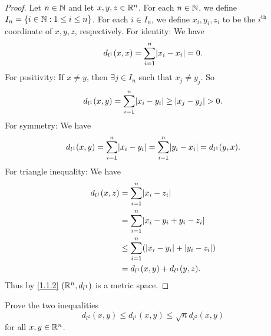 \begin{proof}
  Let \(n \in \mathbb{N}\) and let \(x, y, z \in \mathbb{R}^n\).
  For each \(n \in \mathbb{N}\), we define \(I_n = \{i \in \mathbb{N} : 1 \leq i \leq n\}\).
  For each \(i \in I_n\), we define \(x_i, y_i, z_i\) to be the \(i^{\text{th}}\) coordinate of \(x, y, z\), respectively.
  For identity:
  We have
  \[
    d_{l^1}(x, x) = \sum_{i = 1}^n \abs{x_i - x_i} = 0.
  \]
  For positivity:
  If \(x \neq y\), then \(\exists j \in I_n\) such that \(x_j \neq y_j\).
  So
  \[
    d_{l^1}(x, y) = \sum_{i = 1}^n \abs{x_i - y_i} \geq \abs{x_j - y_j} > 0.
  \]
  For symmetry:
  We have
  \[
    d_{l^1}(x, y) = \sum_{i = 1}^n \abs{x_i - y_i} = \sum_{i = 1}^n \abs{y_i - x_i} = d_{l^1}(y, x).
  \]
  For triangle inequality:
  We have
  \begin{align*}
    d_{l^1}(x, z) & = \sum_{i = 1}^n \abs{x_i - z_i}                        \\
                  & = \sum_{i = 1}^n \abs{x_i - y_i + y_i - z_i}            \\
                  & \leq \sum_{i = 1}^n (\abs{x_i - y_i} + \abs{y_i - z_i}) \\
                  & = d_{l^1}(x, y) + d_{l^1}(y, z).
  \end{align*}
  Thus by \cref{1.1.2} \((\mathbb{R}^n, d_{l^1})\) is a metric space.
\end{proof}

\begin{ex}\label{ex:1.1.8}
  Prove the two inequalities
  \[
    d_{l^2}(x, y) \leq d_{l^1}(x, y) \leq \sqrt{n} d_{l^2}(x, y)
  \]
  for all \(x, y \in \mathbb{R}^n\).
\end{ex}

